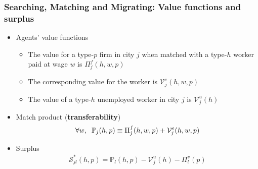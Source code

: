 \documentclass{beamer}
\newcommand{\1}{\mathbb{1}}
\newcommand{\Vuj}{\mathcal{V}^u_{j}}
\newcommand{\Vej}{\mathcal{V}^e_{j}}
\newcommand{\Su}{\mathcal{S}}
\begin{document}
\begin{frame}\frametitle{Searching, Matching and Migrating: Value functions and surplus}
\begin{itemize}
\item Agents' value functions
\begin{itemize}
\item The value for a type-$p$ firm in city $j$ when matched with a type-$h$ worker paid at wage $w$ is $\Pi^f_{j}(h,w,p)$ 
\item The corresponding value for the worker is $\Vej(h,w,p)$ 
\item The value of a type-$h$ unemployed worker in city $j$ is $\Vuj(h)$
\end{itemize}\medskip
\item Match product (\textbf{transferability})
\begin{equation*}
\forall w,\hspace{0.2cm}\mathbb{P}_j(h,p)\equiv \Pi^f_j(h,w,p)+\Vej(h,w,p)
\end{equation*}
\item Surplus
\begin{eqnarray*}
\Su^*_{jl}(h,p)=\mathbb{P}_l(h,p) - \Vuj(h) - \Pi^v_l(p)\\
\end{eqnarray*}
\end{itemize}
\end{frame}
\end{document}
